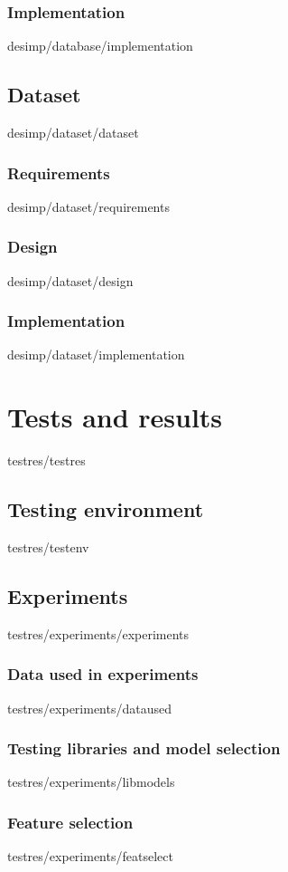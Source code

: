 \documentclass[english,epsbased,copyright,final,printable,covers,extendedindex,firstnumbered,tfg,gnuplot]{tfgtfmthesisuam}
\begin{document}
    \subsection{Implementation\label{SS:DATABASE_IMP}}{desimp/database/implementation}
  \section{Dataset\label{SEC:DATASET_DESIMP}}{desimp/dataset/dataset}
    \subsection{Requirements\label{SS:DATASET_REQ}}{desimp/dataset/requirements}
    \subsection{Design\label{SS:DATASET_DES}}{desimp/dataset/design}
    \subsection{Implementation\label{SS:DATASET_IMP}}{desimp/dataset/implementation}

\chapter{Tests and results\label{CAP:TESTRES}}{testres/testres}
  \section{Testing environment\label{SEC:TESTENV}}{testres/testenv}
  \section{Experiments\label{SEC:EXPERIMENTS}}{testres/experiments/experiments}
    \subsection{Data used in experiments\label{SS:DATAEXP}}{testres/experiments/dataused}
    \subsection{Testing libraries and model selection\label{SS:LIBMODELS}}{testres/experiments/libmodels}
    \subsection{Feature selection\label{SS:FEATSELECT}}{testres/experiments/featselect}
\end{document}
